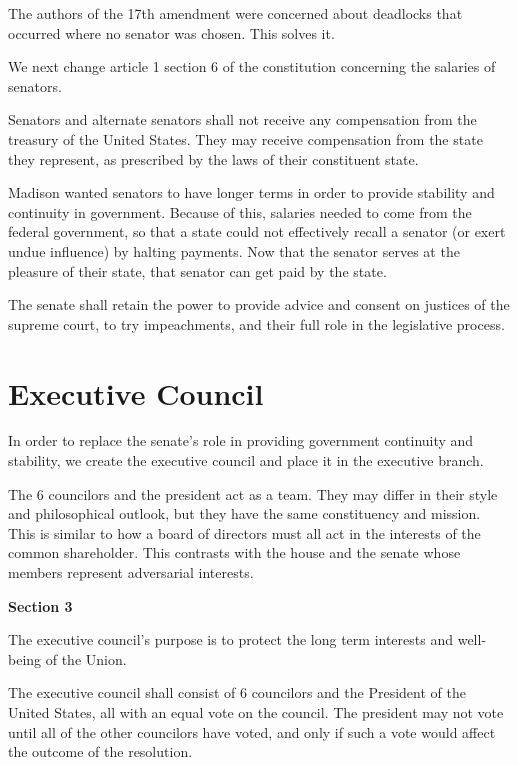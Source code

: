 \documentclass{article}
\begin{document}
The authors of the 17th amendment were concerned about deadlocks that occurred where no senator was chosen. This solves it.

We next change article 1 section 6 of the constitution concerning the salaries of senators.

\begin{quoting}
Senators and alternate senators shall not receive any compensation from the treasury of the United States. They may receive compensation from the state they represent, as prescribed by the laws of their constituent state.
\end{quoting}

Madison wanted senators to have longer terms in order to provide stability and continuity in government. Because of this, salaries needed to come from the federal government, so that a state could not effectively recall a senator (or exert undue influence) by halting payments. Now that the senator serves at the pleasure of their state, that senator can get paid by the state.

\begin{quoting}
The senate shall retain the power to provide advice and consent on justices of the supreme court, to try impeachments, and their full role in the legislative process.
\end{quoting}

\section{Executive Council}

In order to replace the senate’s role in providing government continuity and stability, we create the executive council and place it in the executive branch.

The 6 councilors and the president act as a team. They may differ in their style and philosophical outlook, but they have the same constituency and mission. This is similar to how a board of directors must all act in the interests of the common shareholder. This contrasts with the house and the senate whose members represent adversarial interests. 

\begin{quoting}
\textbf{Section 3}

The executive council’s purpose is to protect the long term interests and well-being of the Union.

The executive council shall consist of 6 councilors and the President of the United States, all with an equal vote on the council. The president may not vote until all of the other councilors have voted, and only if such a vote would affect the outcome of the resolution.
\end{quoting}
\end{document}
